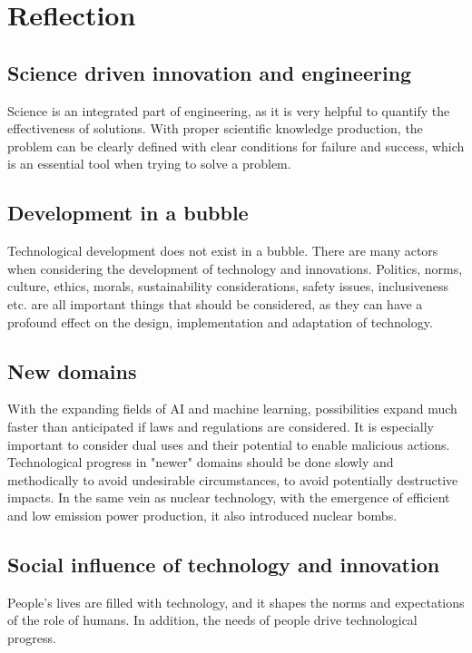 \section*{Reflection}

\subsection*{Science driven innovation and engineering}
Science is an integrated part of engineering, as it is very helpful to quantify the effectiveness of solutions. 
With proper scientific knowledge production, the problem can be clearly defined with clear conditions for failure and success, which is an essential tool when trying to solve a problem. 

\subsection*{Development in a bubble}
Technological development does not exist in a bubble. There are many actors when considering the development of technology and innovations.
Politics, norms, culture, ethics, morals, sustainability considerations, safety issues, inclusiveness etc. are all important things that should be considered, as they can have a profound effect on the design, implementation and adaptation of technology.

\subsection*{New domains}
With the expanding fields of AI and machine learning, possibilities expand much faster than anticipated if laws and regulations are considered.
It is especially important to consider dual uses and their potential to enable malicious actions.
Technological progress in "newer" domains should be done slowly and methodically to avoid undesirable circumstances, to avoid potentially destructive impacts.
In the same vein as nuclear technology, with the emergence of efficient and low emission power production, it also introduced nuclear bombs.

\subsection*{Social influence of technology and innovation}
People's lives are filled with technology, and it shapes the norms and expectations of the role of humans.
In addition, the needs of people drive technological progress.

